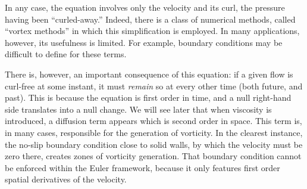 In any case, the equation involves only the velocity and its curl, the
pressure having been ``curled-away.'' Indeed, there is a class of
numerical methods, called ``vortex methods'' in which this
simplification is employed.  In many applications, however, its
usefulness is limited. For example, boundary conditions may be
difficult to define for these terms.

There is, however, an important consequence of this equation: if a
given flow is curl-free at some instant, it must \emph{remain} so
at every other time (both future, and past). This is because the equation
is first order in time, and a null right-hand side translates into
a null change. We will see later that when viscosity is introduced,
a diffusion term appears which is second order in space. This term
is, in many cases, responsible for the generation of vorticity.
In the clearest instance, the no-slip boundary condition close
to solid walls, by which the velocity must be zero there, creates
zones of vorticity generation. That boundary condition cannot be
enforced within the Euler framework, because it only features first order
spatial derivatives of the velocity.
